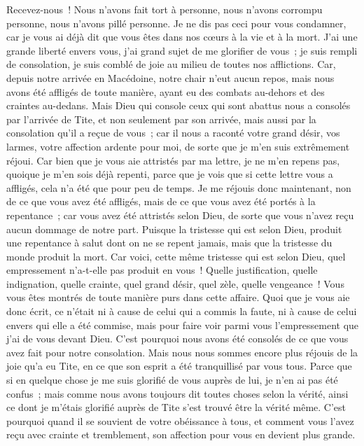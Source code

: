 \begin{multicols}{2}
Recevez-nous~! Nous n'avons fait tort à personne, nous n'avons corrompu personne, nous n'avons pillé personne.
Je ne dis pas ceci pour vous condamner, car je vous ai déjà dit que vous êtes dans nos cœurs à la vie et à la mort.
J'ai une grande liberté envers vous, j'ai grand sujet de me glorifier de vous~; je suis rempli de consolation, je suis comblé de joie au milieu de toutes nos afflictions.
Car, depuis notre arrivée en Macédoine, notre chair n'eut aucun repos, mais nous avons été affligés de toute manière, ayant eu des combats au-dehors et des craintes au-dedans.
Mais Dieu qui console ceux qui sont abattus nous a consolés par l'arrivée de Tite,
et non seulement par son arrivée, mais aussi par la consolation qu'il a reçue de vous~; car il nous a raconté votre grand désir, vos larmes, votre affection ardente pour moi, de sorte que je m'en suis extrêmement réjoui.
Car bien que je vous aie attristés par ma lettre, je ne m'en repens pas, quoique je m'en sois déjà repenti, parce que je vois que si cette lettre vous a affligés, cela n'a été que pour peu de temps.
Je me réjouis donc maintenant, non de ce que vous avez été affligés, mais de ce que vous avez été portés à la repentance~; car vous avez été attristés selon Dieu, de sorte que vous n'avez reçu aucun dommage de notre part.
Puisque la tristesse qui est selon Dieu, produit une repentance à salut dont on ne se repent jamais, mais que la tristesse du monde produit la mort.
Car voici, cette même tristesse qui est selon Dieu, quel empressement n'a-t-elle pas produit en vous~! Quelle justification, quelle indignation, quelle crainte, quel grand désir, quel zèle, quelle vengeance~! Vous vous êtes montrés de toute manière purs dans cette affaire.
Quoi que je vous aie donc écrit, ce n'était ni à cause de celui qui a commis la faute, ni à cause de celui envers qui elle a été commise, mais pour faire voir parmi vous l'empressement que j'ai de vous devant Dieu.
C'est pourquoi nous avons été consolés de ce que vous avez fait pour notre consolation. Mais nous nous sommes encore plus réjouis de la joie qu'a eu Tite, en ce que son esprit a été tranquillisé par vous tous.
Parce que si en quelque chose je me suis glorifié de vous auprès de lui, je n'en ai pas été confus~; mais comme nous avons toujours dit toutes choses selon la vérité, ainsi ce dont je m'étais glorifié auprès de Tite s'est trouvé être la vérité même.
C'est pourquoi quand il se souvient de votre obéissance à tous, et comment vous l'avez reçu avec crainte et tremblement, son affection pour vous en devient plus grande.

\end{multicols}
